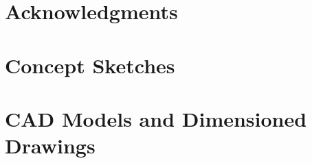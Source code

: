 \documentclass[12pt,oneside,letterpaper,english]{article}
\begin{document}
    \newpage
    \section{Acknowledgments} \label{ch7}
     
    
    \label{EndOfText}
    
    \appendix
    \newpage
    
    \newpage
    \section{Concept Sketches}
     
    \label{appendix:A}
    \thispagestyle{fancy}
    
    \newpage
    \section{CAD Models and Dimensioned Drawings}
     
    \label{appendix:B}
    \thispagestyle{fancy}
    
    \label{EndOfDoc}
\end{document}
